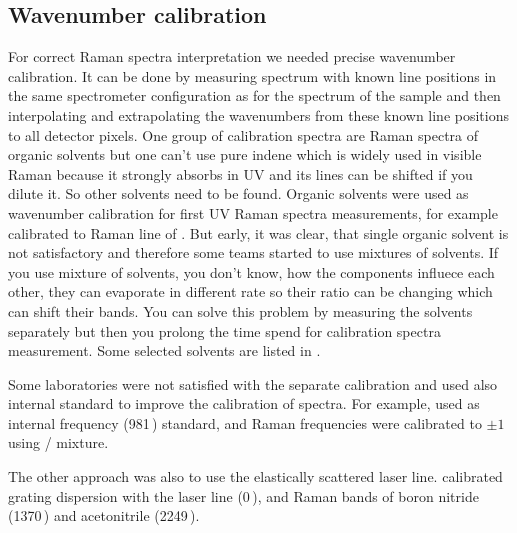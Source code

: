 \subsection{Wavenumber calibration}
\label{wavenumber_calibration}

For correct Raman spectra interpretation we needed precise wavenumber
calibration. It can be done by measuring spectrum with known line positions
in the same spectrometer configuration as for the spectrum of the sample and
then interpolating and extrapolating the wavenumbers from these known line
positions to all detector pixels. One group of calibration spectra are Raman
spectra of organic solvents but one can't use pure indene which is widely
used in visible Raman because it strongly absorbs in UV and its lines can be
shifted if you dilute it. So other solvents need to be found. Organic
solvents were used as wavenumber calibration for first UV Raman spectra
measurements, for example \textcite{Harada1975} calibrated to Raman line of
. But early, it was clear, that single organic solvent is not
satisfactory and therefore some teams started to use mixtures of solvents.
If you use mixture of solvents, you don't know, how the components influece
each other, they can evaporate in different rate so their ratio can be
changing which can shift their bands. You can solve this problem by measuring
the solvents separately but then you prolong the time spend for calibration
spectra measurement. Some selected solvents are listed in
.

\begin{table}
	\centering
	
	\caption{%
		Selection of organic solvents which were used for UV Raman spectra
		wavenumber calibration in literature.%
	}
	\label{\tablabel{wavenumber_calibration:solvents}}
\end{table}

Some laboratories were not satisfied with the separate calibration and used
also internal standard to improve the calibration of spectra. For example,
\textcite{Wen1998} used  as internal frequency (981\,\icm) standard,
and Raman frequencies were calibrated to $\pm1 $\,\icm{} using
/ mixture.

The other approach was also to use the elastically scattered laser line.
 \textcite{Kumamoto2012} calibrated grating dispersion with the laser line
(0\,\icm), and Raman bands of boron nitride (1370\,\icm) and acetonitrile
(2249\,\icm).

